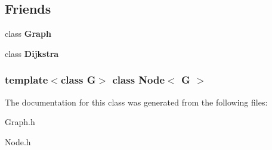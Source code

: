 \subsection*{\-Friends}
\begin{DoxyCompactItemize}
\item 
\hypertarget{classNode_afab89afd724f1b07b1aaad6bdc61c47a}{class {\bfseries \-Graph}}\label{classNode_afab89afd724f1b07b1aaad6bdc61c47a}

\item 
\hypertarget{classNode_a2c018eee3a26b9115c8075f389b717ad}{class {\bfseries \-Dijkstra}}\label{classNode_a2c018eee3a26b9115c8075f389b717ad}

\end{DoxyCompactItemize}
\subsubsection*{template$<$class G$>$ class Node$<$ G $>$}



\-The documentation for this class was generated from the following files\-:\begin{DoxyCompactItemize}
\item 
\-Graph.\-h\item 
\-Node.\-h\end{DoxyCompactItemize}
